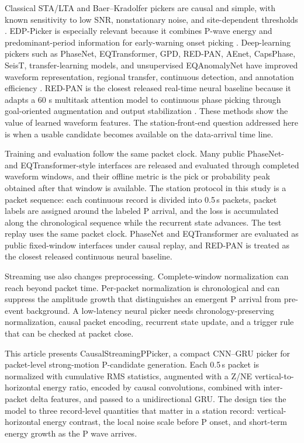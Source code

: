 \documentclass[journal]{IEEEtran}
\newcommand{\modelv}{CausalStreamingPPicker\xspace}
\newcommand{\chunk}{0.5\,s\xspace}
\begin{document}
Classical STA/LTA and Baer--Kradolfer pickers are causal and simple, with known sensitivity to low SNR, nonstationary noise, and site-dependent thresholds \cite{allen1978automatic,baer1987automatic}. EDP-Picker is especially relevant because it combines P-wave energy and predominant-period information for early-warning onset picking \cite{lu2020edppicker}. Deep-learning pickers such as PhaseNet, EQTransformer, GPD, RED-PAN, AEnet, CapsPhase, SeisT, transfer-learning models, and unsupervised EQAnomalyNet have improved waveform representation, regional transfer, continuous detection, and annotation efficiency \cite{zhu2019phasenet,mousavi2020earthquake,ross2018gpd,liao2022redpan,guo2021aenet,saad2022capsphase,saad2024transfer,seist2024,wang2026eqanomalynet}. RED-PAN is the closest released real-time neural baseline because it adapts a 60 s multitask attention model to continuous phase picking through goal-oriented augmentation and output stabilization \cite{liao2022redpan}. These methods show the value of learned waveform features. The station-front-end question addressed here is when a usable candidate becomes available on the data-arrival time line.

Training and evaluation follow the same packet clock. Many public PhaseNet- and EQTransformer-style interfaces are released and evaluated through completed waveform windows, and their offline metric is the pick or probability peak obtained after that window is available. The station protocol in this study is a packet sequence: each continuous record is divided into \chunk packets, packet labels are assigned around the labeled P arrival, and the loss is accumulated along the chronological sequence while the recurrent state advances. The test replay uses the same packet clock. PhaseNet and EQTransformer are evaluated as public fixed-window interfaces under causal replay, and RED-PAN is treated as the closest released continuous neural baseline.

Streaming use also changes preprocessing. Complete-window normalization can reach beyond packet time. Per-packet normalization is chronological and can suppress the amplitude growth that distinguishes an emergent P arrival from pre-event background. A low-latency neural picker needs chronology-preserving normalization, causal packet encoding, recurrent state update, and a trigger rule that can be checked at packet close.

This article presents \modelv, a compact CNN--GRU picker for packet-level strong-motion P-candidate generation. Each \chunk packet is normalized with cumulative RMS statistics, augmented with a Z/NE vertical-to-horizontal energy ratio, encoded by causal convolutions, combined with inter-packet delta features, and passed to a unidirectional GRU. The design ties the model to three record-level quantities that matter in a station record: vertical-horizontal energy contrast, the local noise scale before P onset, and short-term energy growth as the P wave arrives.
\end{document}
